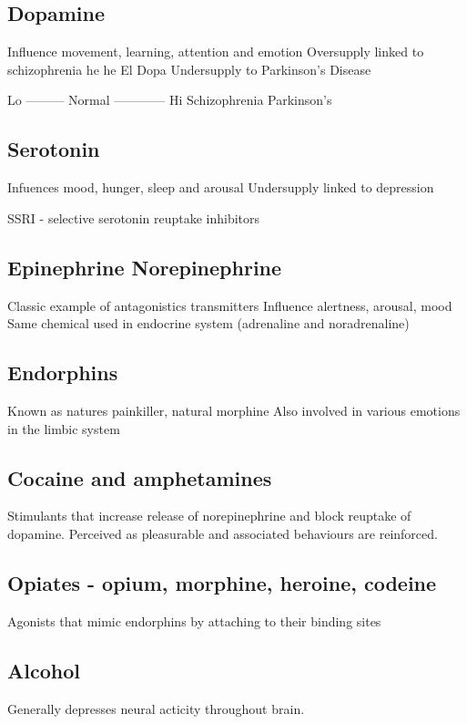 \subsection*{Dopamine}
Influence movement, learning, attention and emotion
Oversupply linked to schizophrenia
  he he El Dopa
Undersupply to Parkinson's Disease

Lo --------- Normal ------------ Hi
                                 Schizophrenia
Parkinson's

\subsection*{Serotonin}
Infuences mood, hunger, sleep and arousal
Undersupply linked to depression

SSRI - selective serotonin reuptake inhibitors

\subsection*{Epinephrine Norepinephrine}
Classic example of antagonistics transmitters
Influence alertness, arousal, mood
Same chemical used in endocrine system (adrenaline and noradrenaline)

\subsection*{Endorphins}
Known as natures painkiller, natural morphine
Also involved in various emotions in the limbic system

\subsection{Cocaine and amphetamines}
Stimulants that increase release of norepinephrine and block reuptake of dopamine. 
Perceived as pleasurable and associated behaviours are reinforced. 

\subsection*{Opiates - opium, morphine, heroine, codeine}
Agonists that mimic endorphins by attaching to their binding sites

\subsection*{Alcohol}
Generally depresses neural acticity throughout brain. 

